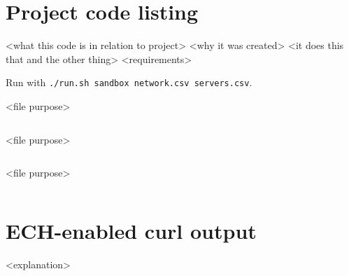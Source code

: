 \chapter{Project code listing}

<what this code is in relation to project>
<why it was created>
<it does this that and the other thing>
<requirements>

Run with \texttt{./run.sh sandbox network.csv servers.csv}.

<file purpose>

\inputminted{text}{../project/scenarios/three/network.csv}

<file purpose>

\inputminted{text}{../project/scenarios/three/servers.csv}

<file purpose>

\inputminted[tabsize=2,breaklines,breakanywhere]{bash}{../project/run.sh}

\chapter{ECH-enabled curl output}

<explanation>

\inputminted[tabsize=2,breaklines,breakanywhere]{text}{snippets/curl}

